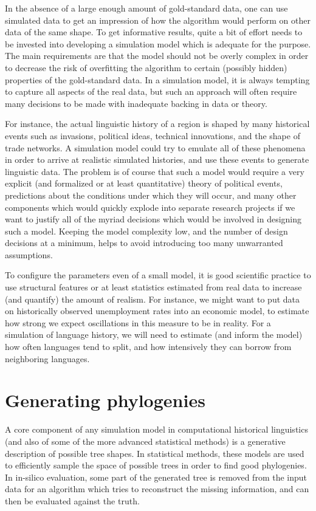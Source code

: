 In the absence of a large enough amount of gold-standard data, one can use simulated data to get an impression of how the algorithm would perform on other data of the same shape. To get informative results, quite a bit of effort needs to be invested into developing a simulation model which is adequate for the purpose. The main requirements are that the model should not be overly complex in order to decrease the risk of overfitting the algorithm to certain (possibly hidden) properties of the gold-standard data. In a simulation model, it is always tempting to capture all aspects of the real data, but such an approach will often require many decisions to be made with inadequate backing in data or theory.

For instance, the actual linguistic history of a region is shaped by many historical events such as invasions, political ideas, technical innovations, and the shape of trade networks. A simulation model could try to emulate all of these phenomena in order to arrive at realistic simulated histories, and use these events to generate linguistic data. The problem is of course that such a model would require a very explicit (and formalized or at least quantitative) theory of political events, predictions about the conditions under which they will occur, and many other components which would quickly explode into separate research projects if we want to justify all of the myriad decisions which would be involved in designing such a model. Keeping the model complexity low, and the number of design decisions at a minimum, helps to avoid introducing too many unwarranted assumptions.

To configure the parameters even of a small model, it is good scientific practice to use structural features or at least statistics estimated from real data to increase (and quantify) the amount of realism. For instance, we might want to put data on historically observed unemployment rates into an economic model, to estimate how strong we expect oscillations in this measure to be in reality. For a simulation of language history, we will need to estimate (and inform the model) how often languages tend to split, and how intensively they can borrow from neighboring languages.

\section{Generating phylogenies}
A core component of any simulation model in computational historical linguistics (and also of some of the more advanced statistical methods) is a generative description of possible tree shapes. In statistical methods, these models are used to efficiently sample the space of possible trees in order to find good phylogenies. In in-silico evaluation, some part of the generated tree is removed from the input data for an algorithm which tries to reconstruct the missing information, and can then be evaluated against the truth.

